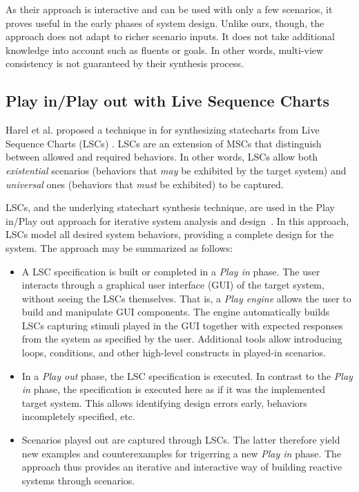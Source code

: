 As their approach is interactive and can be used with only a few scenarios, it proves useful in the early phases of system design. Unlike ours, though, the approach does not adapt to richer scenario inputs. It does not take additional knowledge into account such as fluents or goals. In other words, multi-view consistency is not guaranteed by their synthesis process.


\subsection{Play in/Play out with Live Sequence Charts}

Harel et al. proposed a technique in \cite{Harel:2005} for synthesizing statecharts from Live Sequence Charts (LSCs) \cite{Damm:2001}. LSCs are an extension of MSCs that distinguish between allowed and required behaviors. In other words, LSCs allow both \emph{existential} scenarios (behaviors that \emph{may} be exhibited by the target system) and \emph{universal} ones (behaviors that \emph{must} be exhibited) to be captured.

LSCs, and the underlying statechart synthesis technique, are used in the Play in/Play out approach for iterative system analysis and design~\cite{Harel:2003, Harel:2003b}. In this approach, LSCs model all desired system behaviors, providing a complete design for the system. The approach may be summarized as follows:
\begin{itemize}
\item A LSC specification is built or completed in a \emph{Play in} phase. The user interacts through a graphical user interface (GUI) of the target system, without seeing the LSCs themselves. That is, a \emph{Play engine} allows the user to build and manipulate GUI components. The engine automatically builds LSCs capturing stimuli played in the GUI together with expected responses from the system as specified by the user. Additional tools allow introducing loops, conditions, and other high-level constructs in played-in scenarios.
\item In a \emph{Play out} phase, the LSC specification is executed. In contrast to the \emph{Play in} phase, the specification is executed here as if it was the implemented target system. This allows identifying design errors early, behaviors incompletely specified, etc. 
\item Scenarios played out are captured through LSCs. The latter therefore yield new examples and counterexamples for trigerring a new \emph{Play in} phase. The approach thus provides an iterative and interactive way of building reactive systems through scenarios.
\end{itemize}

